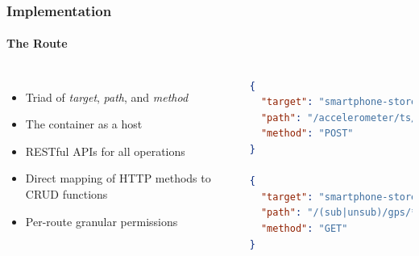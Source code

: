 \documentclass[aspectratio=169]{beamer}
\begin{document}
\begin{frame}[fragile]
	\frametitle{Implementation}
	\framesubtitle{The Route}
	\begin{columns}[c]
		\begin{itemize}
			\item Triad of \textit{target}, \textit{path}, and \textit{method}
			\item The container as a host
			\item RESTful APIs for all operations
			\item Direct mapping of HTTP methods to CRUD functions
			\item Per-route granular permissions
		\end{itemize}
		\centering
		\tiny
		\begin{lstlisting}[language=json]
{
  "target": "smartphone-store",
  "path": "/accelerometer/ts/latest",
  "method": "POST"
}

{
  "target": "smartphone-store",
  "path": "/(sub|unsub)/gps/*",
  "method": "GET"
}
		\end{lstlisting}
	\end{columns}
\end{frame}
\end{document}
